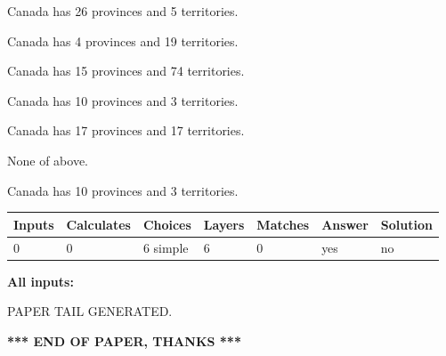 \documentclass[12pt]{article}
\begin{document}
 
Canada has  26 provinces and  5 territories.
 
 
Canada has   4 provinces and  19 territories.
 
 
Canada has  15 provinces and  74 territories.
 
 
Canada has 10  provinces and 3 territories.
 
 
Canada has  17 provinces and  17 territories.
 
 
 None of above.
 
 
\noindent{}
 
 
Canada has 10  provinces and 3 territories.
 
 
\noindent{}
 
 
   
   
   
   
\noindent\begin{tabular}{|l|l|l|l|l|l|l|}
 \hline
Inputs & Calculates & Choices & Layers & Matches & Answer & Solution \\ \hline
 0  & 
 0  & 
 6
  simple  
  & 
 6  & 
 0  & 
  yes & 
  no 
  \\ \hline
 \end{tabular}
   
   
   
   
\noindent{}
   
   
   
   
\noindent\vspace{0.1in}\hspace{-0.08in} {\textbf{\Large{All inputs: }}}
   
   
   
   
   
   
 \vspace{0.2in}
 
   
   
\vspace{2.0in} PAPER TAIL GENERATED.
   
   
   
   
\vspace{1.0in} 
{\textbf{\large{ *** END OF PAPER, THANKS *** }}} 
   
\end{document}
